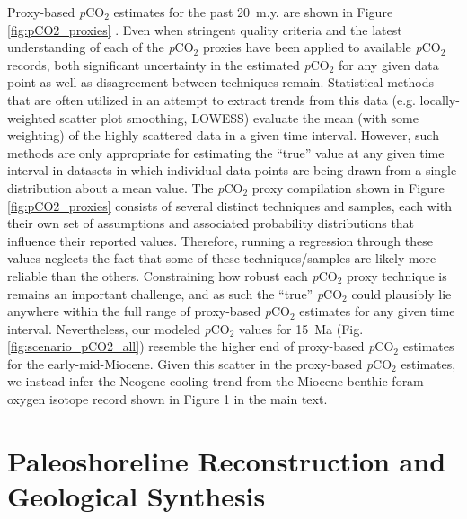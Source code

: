 \documentclass[11pt,letterpaper]{article}
\newcommand{\pCOtwo}{\textit{p}CO$_{2}$\xspace}
\begin{document}
Proxy-based \pCOtwo estimates for the past 20~m.y. are shown in Figure \ref{fig:pCO2_proxies} \citep{Bereiter2015a, Foster2017a, Ji2018a, Cui2020a}. Even when stringent quality criteria and the latest understanding of each of the \pCOtwo proxies have been applied to available \pCOtwo records, both significant uncertainty in the estimated \pCOtwo for any given data point as well as disagreement between techniques remain. Statistical methods that are often utilized in an attempt to extract trends from this data (e.g. locally-weighted scatter plot smoothing, LOWESS) evaluate the mean (with some weighting) of the highly scattered data in a given time interval. However, such methods are only appropriate for estimating the ``true'' value at any given time interval in datasets in which individual data points are being drawn from a single distribution about a mean value. The \pCOtwo proxy compilation shown in Figure \ref{fig:pCO2_proxies} consists of several distinct techniques and samples, each with their own set of assumptions and associated probability distributions that influence their reported values. Therefore, running a regression through these values neglects the fact that some of these techniques/samples are likely more reliable than the others. Constraining how robust each \pCOtwo proxy technique is remains an important challenge, and as such the ``true'' \pCOtwo could plausibly lie anywhere within the full range of proxy-based \pCOtwo estimates for any given time interval. Nevertheless, our modeled \pCOtwo values for 15~Ma (Fig. \ref{fig:scenario_pCO2_all}) resemble the higher end of proxy-based \pCOtwo estimates for the early-mid-Miocene. Given this scatter in the proxy-based \pCOtwo estimates, we instead infer the Neogene cooling trend from the Miocene benthic foram oxygen isotope record shown in Figure 1 in the main text.

\section*{Paleoshoreline Reconstruction and Geological Synthesis}
\end{document}
